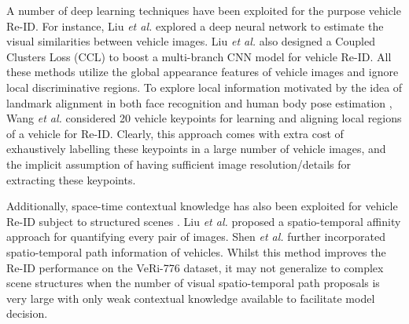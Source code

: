 \documentclass[10pt,twocolumn,letterpaper]{article}
\def\etal{\emph{et al.\hspace{0.3em}}}
\begin{document}
A number of deep learning techniques have been exploited for the purpose vehicle Re-ID. For instance, Liu
\etal \cite{liu2016veri} explored a deep neural network to estimate the
visual similarities between vehicle images.
%
Liu \etal \cite{liu2016vehicleid} also designed a Coupled Clusters Loss (CCL)
to boost a multi-branch CNN model for vehicle Re-ID.
%
All these methods utilize the global appearance features of vehicle images and
ignore local discriminative regions.
%
To explore local information motivated by the idea of landmark alignment
\cite{zhang2014facial} in both face recognition \cite{taigman2014deepface} and
human body pose estimation \cite{newell2016stacked}, Wang \etal
\cite{Wang_2017_ICCV} considered 20 vehicle keypoints for learning and aligning
local regions of a vehicle for Re-ID.  Clearly, this approach comes with extra
cost of exhaustively labelling these keypoints in a large number of vehicle
images, and the implicit assumption of having sufficient image
resolution/details for extracting these keypoints.
%

Additionally,
space-time contextual knowledge has also been exploited for vehicle Re-ID
subject to structured scenes \cite{liu2016veri,Shen_2017_ICCV}.
Liu \etal \cite{liu2016veri} proposed
a spatio-temporal affinity approach for quantifying every pair of images.
%
Shen \etal \cite{Shen_2017_ICCV} further
incorporated spatio-temporal path information of vehicles.
Whilst this method improves the Re-ID performance on the VeRi-776 dataset,
it may not generalize to complex scene structures when the number of
visual spatio-temporal path proposals is very large with only weak contextual
knowledge available to facilitate model decision.
\end{document}
